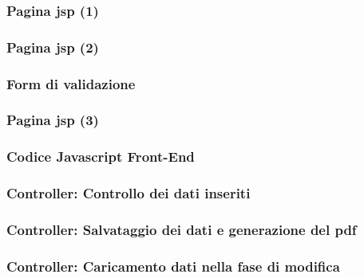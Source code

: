 \documentclass[]{beamer}
\begin{document}
    \begin{frame}
        \frametitle{Pagina jsp (1)}
        
    \end{frame}


    \begin{frame}
        \frametitle{Pagina jsp (2)}
        
    \end{frame}

    \begin{frame}
        \frametitle{Form di validazione}
        
    \end{frame}

    \begin{frame}
        \frametitle{Pagina jsp (3)}
        
    \end{frame}

    \begin{frame}
        \frametitle{Codice Javascript Front-End}
        
    \end{frame}

    \begin{frame}
        \frametitle{Controller: Controllo dei dati inseriti}
        
    \end{frame}

    \begin{frame}
        \frametitle{Controller: Salvataggio dei dati e generazione del pdf}
        
    \end{frame}

    \begin{frame}
        \frametitle{Controller: Caricamento dati nella fase di modifica}
        
    \end{frame}
\end{document}
